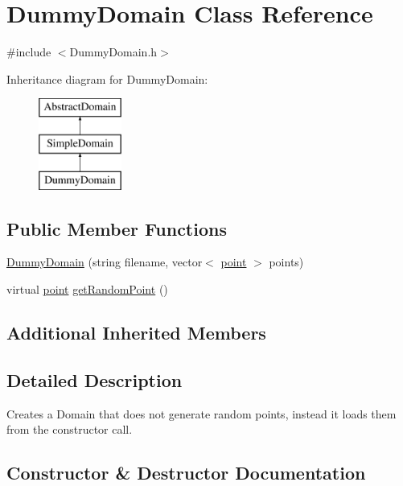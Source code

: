 \hypertarget{class_dummy_domain}{}\section{Dummy\+Domain Class Reference}
\label{class_dummy_domain}


{\ttfamily \#include $<$Dummy\+Domain.\+h$>$}

Inheritance diagram for Dummy\+Domain\+:\begin{figure}[H]
\begin{center}
\leavevmode
\includegraphics[height=3.000000cm]{class_dummy_domain}
\end{center}
\end{figure}
\subsection*{Public Member Functions}
\begin{DoxyCompactItemize}
\item 
\mbox{\hyperlink{class_dummy_domain_a19d6dde5b2f9be766cf2b838fac1f3bb}{Dummy\+Domain}} (string filename, vector$<$ \mbox{\hyperlink{structpoint}{point}} $>$ points)
\item 
virtual \mbox{\hyperlink{structpoint}{point}} \mbox{\hyperlink{class_dummy_domain_a72074e5e3e53028ec4b73bffee1ba229}{get\+Random\+Point}} ()
\end{DoxyCompactItemize}
\subsection*{Additional Inherited Members}


\subsection{Detailed Description}
Creates a Domain that does not generate random points, instead it loads them from the constructor call. 

\subsection{Constructor \& Destructor Documentation}
\mbox{\label{class_dummy_domain_a19d6dde5b2f9be766cf2b838fac1f3bb}} 
